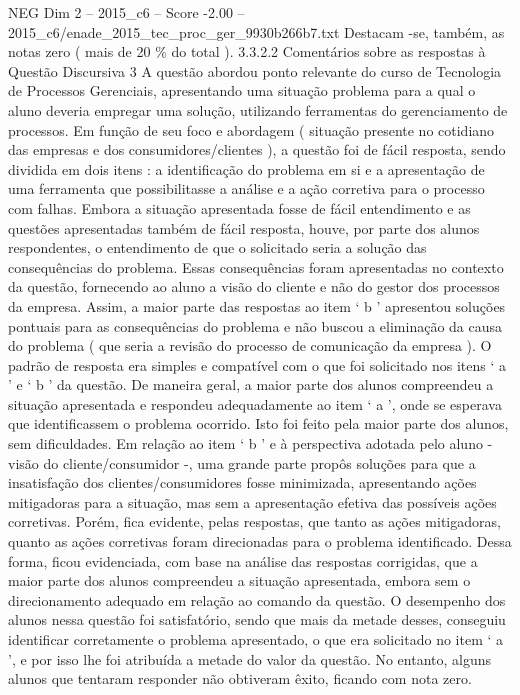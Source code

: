 \begin{textsample}{NEG Dim 2 – 2015\_c6 – Score -2.00 – 2015\_c6/enade\_2015\_tec\_proc\_ger\_9930b266b7.txt}
Destacam -se, também, as notas zero ( mais de 20 \% do total ). 3.3.2.2 Comentários sobre as respostas à Questão Discursiva 3 A questão abordou ponto relevante do curso de Tecnologia de Processos Gerenciais, apresentando uma situação problema para a qual o aluno deveria empregar uma solução, utilizando ferramentas do gerenciamento de processos.
Em função de seu foco e abordagem ( situação presente no cotidiano das empresas e dos consumidores/clientes ), a questão foi de fácil resposta, sendo dividida em dois itens : a identificação do problema em si e a apresentação de uma ferramenta que possibilitasse a análise e a ação corretiva para o processo com falhas.
Embora a situação apresentada fosse de fácil entendimento e as questões apresentadas também de fácil resposta, houve, por parte dos alunos respondentes, o entendimento de que o solicitado seria a solução das consequências do problema.
Essas consequências foram apresentadas no contexto da questão, fornecendo ao aluno a visão do cliente e não do gestor dos processos da empresa.
Assim, a maior parte das respostas ao item ‘ b ’ apresentou soluções pontuais para as consequências do problema e não buscou a eliminação da causa do problema ( que seria a revisão do processo de comunicação da empresa ).
O padrão de resposta era simples e compatível com o que foi solicitado nos itens ‘ a ’ e ‘ b ’ da questão.
De maneira geral, a maior parte dos alunos compreendeu a situação apresentada e respondeu adequadamente ao item ‘ a ’, onde se esperava que identificassem o problema ocorrido.
Isto foi feito pela maior parte dos alunos, sem dificuldades.
Em relação ao item ‘ b ’ e à perspectiva adotada pelo aluno - visão do cliente/consumidor -, uma grande parte propôs soluções para que a insatisfação dos clientes/consumidores fosse minimizada, apresentando ações mitigadoras para a situação, mas sem a apresentação efetiva das possíveis ações corretivas.
Porém, fica evidente, pelas respostas, que tanto as ações mitigadoras, quanto as ações corretivas foram direcionadas para o problema identificado.
Dessa forma, ficou evidenciada, com base na análise das respostas corrigidas, que a maior parte dos alunos compreendeu a situação apresentada, embora sem o direcionamento adequado em relação ao comando da questão.
O desempenho dos alunos nessa questão foi satisfatório, sendo que mais da metade desses, conseguiu identificar corretamente o problema apresentado, o que era solicitado no item ‘ a ’, e por isso lhe foi atribuída a metade do valor da questão.
No entanto, alguns alunos que tentaram responder não obtiveram êxito, ficando com nota zero.

\end{textsample}

